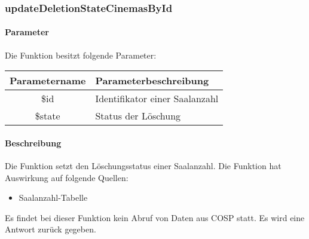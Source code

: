 \subsubsection{updateDeletionStateCinemasById}
\paragraph{Parameter} Die Funktion besitzt folgende Parameter:
\begin{table}[H]
	\begin{tabular}{|c|p{11cm}|}
		\hline
		\textbf{Parametername} & \textbf{Parameterbeschreibung} \\ \hline
		\$id       & Identifikator einer Saalanzahl \\ \hline
		\$state    & Status der Löschung \\ \hline
	\end{tabular}
\end{table}
\paragraph{Beschreibung} Die Funktion setzt den Löschungsstatus einer Saalanzahl. Die Funktion hat Auswirkung auf folgende Quellen:
\begin{itemize}
	\item Saalanzahl-Tabelle
\end{itemize}
Es findet bei dieser Funktion kein Abruf von Daten aus {\glqq COSP\grqq} statt. Es wird eine Antwort zurück gegeben.